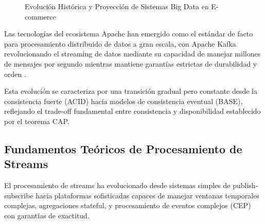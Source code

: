 \documentclass[conference,10pt,letterpaper]{IEEEtran}
\begin{document}
\begin{figure}[H]
\caption{Evolución Histórica y Proyección de Sistemas Big Data en E-commerce}
\label{fig:evolution_timeline}
\end{figure}

\vspace{0.3cm}

Las tecnologías del ecosistema Apache han emergido como el estándar de facto para procesamiento distribuido de datos a gran escala, con Apache Kafka revolucionando el streaming de datos mediante su capacidad de manejar millones de mensajes por segundo mientras mantiene garantías estrictas de durabilidad y orden \cite{kreps2011kafka}.

Esta evolución se caracteriza por una transición gradual pero constante desde la consistencia fuerte (ACID) hacia modelos de consistencia eventual (BASE), reflejando el trade-off fundamental entre consistencia y disponibilidad establecido por el teorema CAP.

\subsection{Fundamentos Teóricos de Procesamiento de Streams}
\label{subsec:streaming_theory}

El procesamiento de streams ha evolucionado desde sistemas simples de publish-subscribe hacia plataformas sofisticadas capaces de manejar ventanas temporales complejas, agregaciones stateful, y procesamiento de eventos complejos (CEP) con garantías de exactitud.

\vspace{0.2cm}
\end{document}
